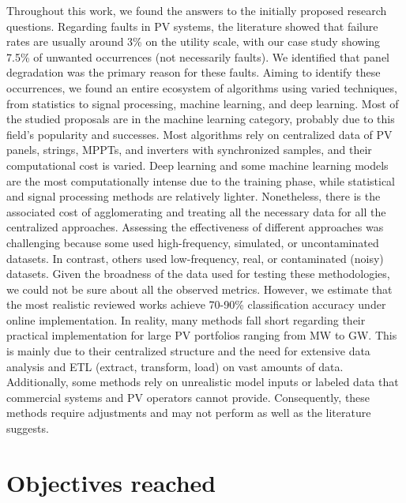 Throughout this work, we found the answers to the initially proposed research questions. Regarding faults in PV systems, the literature showed that failure rates are usually around 3\% on the utility scale, with our case study showing 7.5\% of unwanted occurrences (not necessarily faults). We identified that panel degradation was the primary reason for these faults. Aiming to identify these occurrences, we found an entire ecosystem of algorithms using varied techniques, from statistics to signal processing, machine learning, and deep learning. Most of the studied proposals are in the machine learning category, probably due to this field's popularity and successes. Most algorithms rely on centralized data of PV panels, strings, MPPTs, and inverters with synchronized samples, and their computational cost is varied. Deep learning and some machine learning models are the most computationally intense due to the training phase, while statistical and signal processing methods are relatively lighter. Nonetheless, there is the associated cost of agglomerating and treating all the necessary data for all the centralized approaches.
Assessing the effectiveness of different approaches was challenging because some used high-frequency, simulated, or uncontaminated datasets. In contrast, others used low-frequency, real, or contaminated (noisy) datasets. Given the broadness of the data used for testing these methodologies, we could not be sure about all the observed metrics. However, we estimate that the most realistic reviewed works achieve 70-90\% classification accuracy under online implementation.
In reality, many methods fall short regarding their practical implementation for large PV portfolios ranging from MW to GW. This is mainly due to their centralized structure and the need for extensive data analysis and ETL (extract, transform, load) on vast amounts of data. Additionally, some methods rely on unrealistic model inputs or labeled data that commercial systems and PV operators cannot provide. Consequently, these methods require adjustments and may not perform as well as the literature suggests.

\section{Objectives reached}

